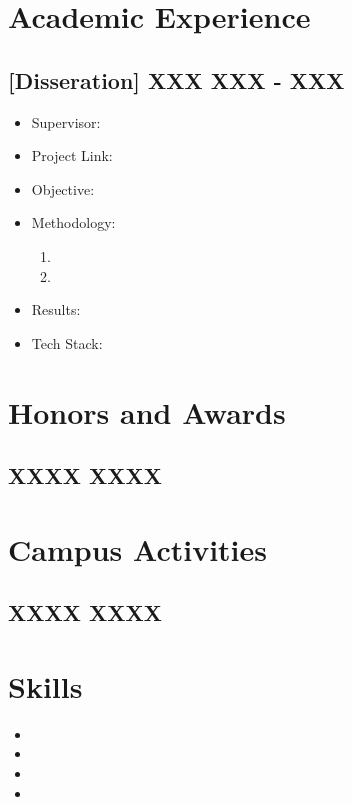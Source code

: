 \documentclass[a4paper,10pt]{article}
\begin{document}
\section*{Academic Experience}
\subsection*{[Disseration] XXX \hfill XXX - XXX}
\begin{itemize}
    \item Supervisor: 
    \item Project Link: 
    \item Objective:
    \item Methodology:
    \begin{enumerate}
        \item 
        \item 
    \end{enumerate}
    \item Results: 
    \item Tech Stack:
\end{itemize}

\section*{Honors and Awards}
\subsection*{XXXX \hfill XXXX}

\section*{Campus Activities}
\subsection*{XXXX \hfill XXXX}

\section*{Skills}
\begin{itemize}
    \item 
    \item 
    \item 
    \item 
\end{itemize}
\end{document}
